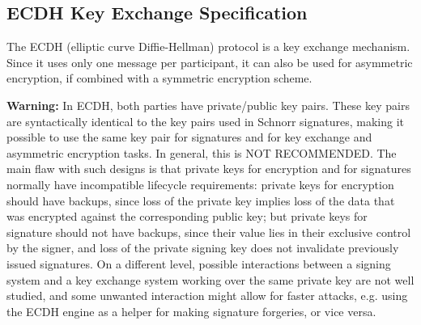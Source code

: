 \documentclass{llncs}
\begin{document}
\subsection{ECDH Key Exchange Specification}\label{sec:spec-ecdh}

The ECDH (elliptic curve Diffie-Hellman) protocol is a key exchange
mechanism. Since it uses only one message per participant, it can also
be used for asymmetric encryption, if combined with a symmetric
encryption scheme.

\noindent\textsf{\textbf{Warning:}} In ECDH, both parties have
private/public key pairs. These key pairs are syntactically identical to
the key pairs used in Schnorr signatures, making it possible to use the
same key pair for signatures and for key exchange and asymmetric
encryption tasks. In general, this is NOT RECOMMENDED. The main flaw
with such designs is that private keys for encryption and for signatures
normally have incompatible lifecycle requirements: private keys for
encryption should have backups, since loss of the private key implies
loss of the data that was encrypted against the corresponding public
key; but private keys for signature should not have backups, since their
value lies in their exclusive control by the signer, and loss of the
private signing key does not invalidate previously issued signatures. On
a different level, possible interactions between a signing system and a
key exchange system working over the same private key are not well
studied, and some unwanted interaction might allow for faster attacks,
e.g. using the ECDH engine as a helper for making signature forgeries,
or vice versa.
\end{document}
